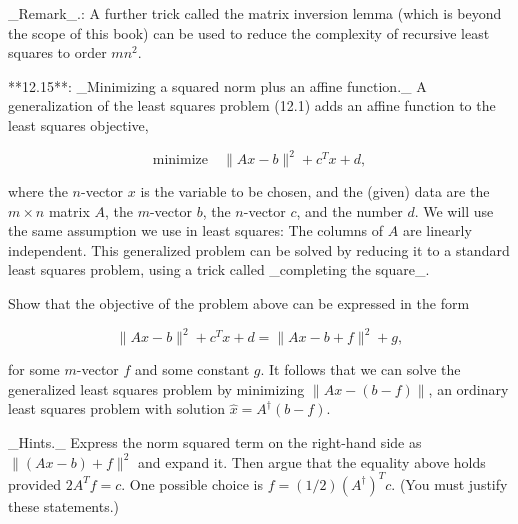 _Remark_.: A further trick called the matrix inversion lemma (which is beyond the scope of this book) can be used to reduce the complexity of recursive least squares to order \(mn^{2}\).

**12.15**: _Minimizing a squared norm plus an affine function._ A generalization of the least squares problem (12.1) adds an affine function to the least squares objective,

\[\text{minimize}\quad\|Ax-b\|^{2}+c^{T}x+d,\]

where the \(n\)-vector \(x\) is the variable to be chosen, and the (given) data are the \(m\times n\) matrix \(A\), the \(m\)-vector \(b\), the \(n\)-vector \(c\), and the number \(d\). We will use the same assumption we use in least squares: The columns of \(A\) are linearly independent. This generalized problem can be solved by reducing it to a standard least squares problem, using a trick called _completing the square_.

Show that the objective of the problem above can be expressed in the form

\[\|Ax-b\|^{2}+c^{T}x+d=\|Ax-b+f\|^{2}+g,\]

for some \(m\)-vector \(f\) and some constant \(g\). It follows that we can solve the generalized least squares problem by minimizing \(\|Ax-(b-f)\|\), an ordinary least squares problem with solution \(\hat{x}=A^{\dagger}(b-f)\).

_Hints._ Express the norm squared term on the right-hand side as \(\|(Ax-b)+f\|^{2}\) and expand it. Then argue that the equality above holds provided \(2A^{T}f=c\). One possible choice is \(f=(1/2)(A^{\dagger})^{T}c\). (You must justify these statements.)